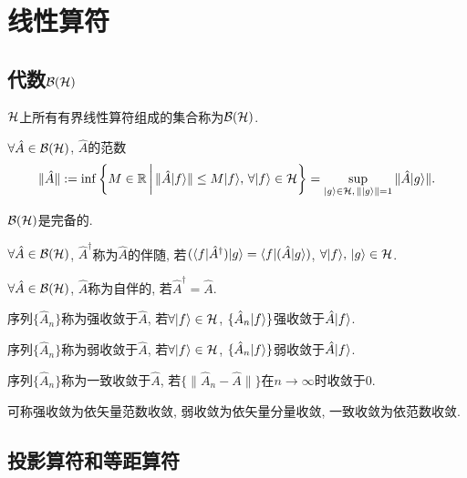 \chapter{线性算符}

\section{代数$\mathcal{B}(\mathcal{H})$}

\begin{definition}
    $\mathcal{H}$上所有有界线性算符组成的集合称为$\mathcal{B}(\mathcal{H})$.
\end{definition}
\begin{definition}
    $\forall\hat{A}\in\mathcal{B}(\mathcal{H})$, $\hat{A}$的范数
    \begin{equation*}
        \lVert\hat{A}\rVert:=\inf\left\{M\in\mathbb{R}\,\bigg|\,\lVert\hat{A}|f\rangle\rVert\le M|f\rangle,\,\forall|f\rangle\in\mathcal{H}\right\}=\sup_{|g\rangle\in\mathcal{H},\,\lVert|g\rangle\rVert=1}{\lVert\hat{A}|g\rangle\rVert}.
    \end{equation*}
\end{definition}
\begin{theorem}
    $\mathcal{B}(\mathcal{H})$是完备的.
\end{theorem}

\begin{definition}
    $\forall\hat{A}\in\mathcal{B}(\mathcal{H})$, $\hat{A}^{\dagger}$称为$\hat{A}$的伴随, 若$(\langle f|\hat{A}^{\dagger})|g\rangle=\langle f|(\hat{A}|g\rangle)$, $\forall|f\rangle,\,|g\rangle\in\mathcal{H}$.
\end{definition}
\begin{definition}
    $\forall\hat{A}\in\mathcal{B}(\mathcal{H})$, $\hat{A}$称为自伴的, 若$\hat{A}^{\dagger}=\hat{A}$.
\end{definition}

\begin{definition}
    序列$\{\hat{A}_n\}$称为强收敛于$\hat{A}$, 若$\forall|f\rangle\in\mathcal{H}$, $\{\hat{A}_n|f\rangle\}$强收敛于$\hat{A}|f\rangle$.
\end{definition}
\begin{definition}
    序列$\{\hat{A}_n\}$称为弱收敛于$\hat{A}$, 若$\forall|f\rangle\in\mathcal{H}$, $\{\hat{A}_n|f\rangle\}$弱收敛于$\hat{A}|f\rangle$.
\end{definition}
\begin{definition}
    序列$\{\hat{A}_n\}$称为一致收敛于$\hat{A}$, 若$\{\lVert\hat{A}_n-\hat{A}\rVert\}$在$n\to\infty$时收敛于$0$.
\end{definition}
可称强收敛为依矢量范数收敛, 弱收敛为依矢量分量收敛, 一致收敛为依范数收敛.

\section{投影算符和等距算符}


